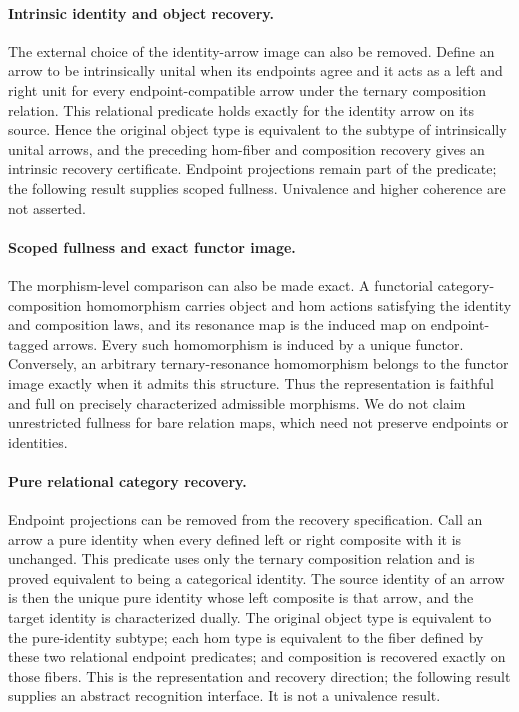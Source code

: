 \documentclass[11pt]{article}
\theoremstyle{definition}
\begin{document}
\paragraph{Intrinsic identity and object recovery.}
The external choice of the identity-arrow image can also be removed.  Define
an arrow to be intrinsically unital when its endpoints agree and it acts as a
left and right unit for every endpoint-compatible arrow under the ternary
composition relation.  This relational predicate holds exactly for the
identity arrow on its source.  Hence the original object type is equivalent to
the subtype of intrinsically unital arrows, and the preceding hom-fiber and
composition recovery gives an intrinsic recovery certificate.  Endpoint
projections remain part of the predicate; the following result supplies
scoped fullness. Univalence and higher coherence are not asserted.

\paragraph{Scoped fullness and exact functor image.}
The morphism-level comparison can also be made exact.  A functorial
category-composition homomorphism carries object and hom actions satisfying
the identity and composition laws, and its resonance map is the induced map
on endpoint-tagged arrows.  Every such homomorphism is induced by a unique
functor.  Conversely, an arbitrary ternary-resonance homomorphism belongs to
the functor image exactly when it admits this structure.  Thus the
representation is faithful and full on precisely characterized admissible
morphisms.  We do not claim unrestricted fullness for bare relation maps,
which need not preserve endpoints or identities.

\paragraph{Pure relational category recovery.}
Endpoint projections can be removed from the recovery specification.  Call an
arrow a pure identity when every defined left or right composite with it is
unchanged.  This predicate uses only the ternary composition relation and is
proved equivalent to being a categorical identity.  The source identity of an
arrow is then the unique pure identity whose left composite is that arrow, and
the target identity is characterized dually.  The original object type is
equivalent to the pure-identity subtype; each hom type is equivalent to the
fiber defined by these two relational endpoint predicates; and composition is
recovered exactly on those fibers.  This is the representation and recovery
direction; the following result supplies an abstract recognition interface.
It is not a univalence result.
\end{document}
